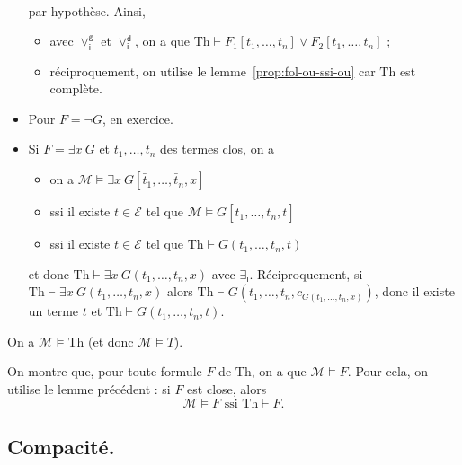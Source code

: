 \documentclass[./main]{subfiles}
\begin{document}
\begin{prv}
\begin{itemize}
\begin{align*}
        \end{align*}
        par hypothèse.
        Ainsi,
        \begin{itemize}
          \item avec $\lor_\mathsf{i}^\mathsf{g}$ et $\lor_\mathsf{i}^\mathsf{d}$, on a que $\mathrm{Th} \vdash F_1[t_1, \ldots, t_n] \lor F_2[t_1, \ldots, t_n]$ ;
          \item réciproquement, on utilise le lemme~\ref{prop:fol-ou-ssi-ou} car $\mathrm{Th}$ est complète.
        \end{itemize}
      \item Pour $F = \lnot G$, en exercice.
      \item Si  $F = \exists x \: G$ et $t_1, \ldots, t_n$ des termes clos, on a 
        \begin{itemize}
          \item on a $\mathcal{M} \models \exists x \: G[\bar{t}_1, \ldots, \bar{t}_n, x]$ 
          \item ssi il existe $t \in \mathcal{E}$ tel que $\mathcal{M} \models G[\bar{t}_1, \ldots, \bar{t}_n, \bar{t}]$
          \item ssi il existe $t \in \mathcal{E}$ tel que $\mathrm{Th} \vdash G(t_1, \ldots, t_n,t)$
        \end{itemize}
        et donc $\mathrm{Th} \vdash \exists x \: G(t_1, \ldots, t_n, x)$ avec $\exists_\mathsf{i}$.
        Réciproquement, si $\mathrm{Th} \vdash \exists x \: G(t_1, \ldots, t_n, x)$ alors $\mathrm{Th} \vdash G(t_1, \ldots, t_n, c_{G(t_1, \ldots, t_n, x)})$, donc il existe un terme $t$ et $\mathrm{Th} \vdash G(t_1, \ldots, t_n, t)$.
    \end{itemize}
  \end{prv}


  \begin{lem}
    On a $\mathcal{M} \models \mathrm{Th}$ (et donc $\mathcal{M} \models T$).
  \end{lem}

  \begin{prv}
    On montre que, pour toute formule $F$ de $\mathrm{Th}$, on a que $\mathcal{M} \models F$.
    Pour cela, on utilise le lemme précédent : si $F$ est close, alors
    \[
    \mathcal{M} \models F \text{ ssi } \mathrm{Th} \vdash F
    .\]
  \end{prv}

  \subsection{Compacité.}
\end{document}
